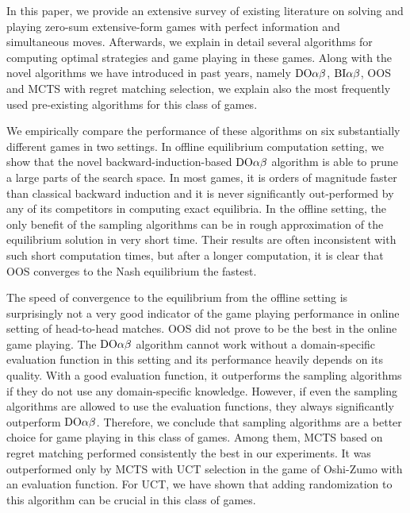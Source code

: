 
In this paper, we provide an extensive survey of existing literature on solving and playing zero-sum extensive-form games with perfect information and simultaneous moves. Afterwards, we explain in detail several algorithms for computing optimal strategies and game playing in these games. Along with the novel algorithms we have introduced in past years, namely $\textrm{DO}\alpha\beta$, $\textrm{BI}\alpha\beta$, OOS and MCTS with regret matching selection, we explain also the most frequently used pre-existing algorithms for this class of games.

We empirically compare the performance of these algorithms on six substantially different games in two settings. In offline equilibrium computation setting, we show that the novel backward-induction-based $\textrm{DO}\alpha\beta$ algorithm is able to prune a large parts of the search space. In most games, it is orders of magnitude faster than classical backward induction and it is never significantly out-performed by any of its competitors in computing exact equilibria. In the offline setting, the only benefit of the sampling algorithms can be in rough approximation of the equilibrium solution in very short time. Their results are often inconsistent with such short computation times, but after a longer computation, it is clear that OOS converges to the Nash equilibrium the fastest.

The speed of convergence to the equilibrium from the offline setting is surprisingly not a very good indicator of the game playing performance in online setting of head-to-head matches. OOS did not prove to be the best in the online game playing. The $\textrm{DO}\alpha\beta$ algorithm cannot work without a domain-specific evaluation function in this setting and its performance heavily depends on its quality. With a good evaluation function, it outperforms the sampling algorithms if they do not use any domain-specific knowledge. However, if even the sampling algorithms are allowed to use the evaluation functions, they always significantly outperform $\textrm{DO}\alpha\beta$. Therefore, we conclude that sampling algorithms are a better choice for game playing in this class of games. Among them, MCTS based on regret matching performed consistently the best in our experiments. It was outperformed only by MCTS with UCT selection in the game of Oshi-Zumo with an evaluation function. For UCT, we have shown that adding randomization to this algorithm can be crucial in this class of games.

